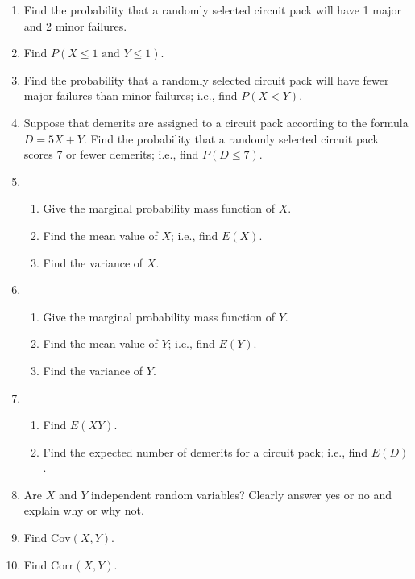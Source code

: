 \documentclass{report}
\begin{document}
\begin{mdframed}
\begin{enumerate}[label=\arabic*.]
    \begin{enumerate}[label=(\alph*)]
        \item Find the probability that a randomly selected circuit pack will have 1 major and 2 minor failures.
        \item Find \( P(X \leq 1 \text{ and } Y \leq 1) \).
        \item Find the probability that a randomly selected circuit pack will have fewer major failures than minor failures; i.e., find \( P(X < Y) \).
        \item Suppose that demerits are assigned to a circuit pack according to the formula \( D = 5X + Y \). Find the probability that a randomly selected circuit pack scores 7 or fewer demerits; i.e., find \( P(D \leq 7) \).
        \item 
            \begin{enumerate}[label=(\roman*)]
                \item Give the marginal probability mass function of \( X \).
                \item Find the mean value of \( X \); i.e., find \( E(X) \).
                \item Find the variance of \( X \).
            \end{enumerate}
        \item 
            \begin{enumerate}[label=(\roman*)]
                \item Give the marginal probability mass function of \( Y \).
                \item Find the mean value of \( Y \); i.e., find \( E(Y) \).
                \item Find the variance of \( Y \).
            \end{enumerate}
        \item 
            \begin{enumerate}[label=(\roman*)]
                \item Find \( E(XY) \).
                \item Find the expected number of demerits for a circuit pack; i.e., find \( E(D) \).
            \end{enumerate}
        \item Are \( X \) and \( Y \) independent random variables? Clearly answer yes or no and explain why or why not.
        \item Find \( \text{Cov}(X, Y) \).
        \item Find \( \text{Corr}(X, Y) \).
    \end{enumerate}
\end{enumerate}
\end{mdframed}
\end{document}
